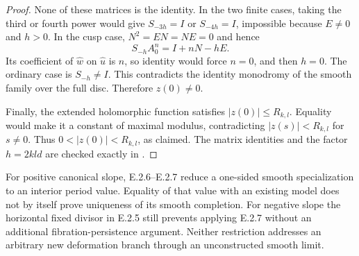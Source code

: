 \begin{proof}
None of these matrices is the identity.  In the two
finite cases, taking the third or fourth power would
give $S_{-3h}=I$ or $S_{-4h}=I$, impossible because
$E\ne0$ and $h>0$.  In the cusp case, $N^2=EN=NE=0$
and hence
\[
 S_{-h}A_0^n=I+nN-hE.
\]
Its coefficient of $\widehat w$ on $\widehat u$ is
$n$, so identity would force $n=0$, and then $h=0$.
The ordinary case is $S_{-h}\ne I$.  This contradicts
the identity monodromy of the smooth family over
the full disc.  Therefore $z(0)\ne0$.

Finally, the extended holomorphic function satisfies
$|z(0)|\le R_{k,l}$.  Equality would make it a constant
of maximal modulus, contradicting $|z(s)|<R_{k,l}$
for $s\ne0$.  Thus $0<|z(0)|<R_{k,l}$, as claimed.
The matrix identities and the factor $h=2kld$ are
checked exactly in .
\end{proof}

\begin{remark}
For positive canonical slope, E.2.6--E.2.7 reduce a
one-sided smooth specialization to an interior period
value.  Equality of that value with an existing model
does not by itself prove uniqueness of its smooth
completion.  For negative slope the horizontal fixed
divisor in E.2.5 still prevents applying E.2.7 without
an additional fibration-persistence argument.  Neither
restriction addresses an arbitrary new deformation
branch through an unconstructed smooth limit.
\end{remark}
